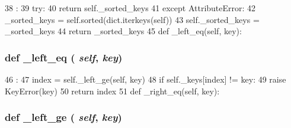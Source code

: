 \begin{DoxyCode}
38                    :
39         try:
40             return self._sorted_keys
41         except AttributeError:
42             _sorted_keys = self.sorted(dict.iterkeys(self))
43             self._sorted_keys = _sorted_keys
44             return _sorted_keys
45 
    def _left_eq(self, key):
\end{DoxyCode}
\hypertarget{classm5_1_1util_1_1sorteddict_1_1SortedDict_a220ecd5f641dbe0ace0ff5af843336ec}{
\subsubsection[{\_\-left\_\-eq}]{\setlength{\rightskip}{0pt plus 5cm}def \_\-left\_\-eq ( {\em self}, \/   {\em key})}}
\label{classm5_1_1util_1_1sorteddict_1_1SortedDict_a220ecd5f641dbe0ace0ff5af843336ec}



\begin{DoxyCode}
46                            :
47         index = self._left_ge(self, key)
48         if self._keys[index] != key:
49             raise KeyError(key)
50         return index
51 
    def _right_eq(self, key):
\end{DoxyCode}
\hypertarget{classm5_1_1util_1_1sorteddict_1_1SortedDict_a4601619ab3ade344020b159cbd5ef089}{
\subsubsection[{\_\-left\_\-ge}]{\setlength{\rightskip}{0pt plus 5cm}def \_\-left\_\-ge ( {\em self}, \/   {\em key})}}
\label{classm5_1_1util_1_1sorteddict_1_1SortedDict_a4601619ab3ade344020b159cbd5ef089}



